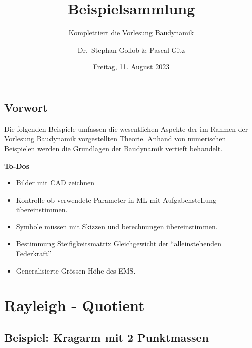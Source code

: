\documentclass[
  letterpaper,
  DIV=11]{scrreprt}
\title{Beispielsammlung}
\subtitle{Komplettiert die Vorlesung Baudynamik}
\author{Dr.~Stephan Gollob \& Pascal Gitz}
\date{Freitag, 11. August 2023}
\providecommand{\tightlist}{%
  \setlength{\itemsep}{0pt}\setlength{\parskip}{0pt}}\usepackage{longtable,booktabs,array}
\renewcommand*\contentsname{Inhaltsverzeichnis}
\newcommand\contentsname{Inhaltsverzeichnis}
\begin{document}
\maketitle
\ifdefined\Shaded\renewenvironment{Shaded}{\begin{tcolorbox}[enhanced, boxrule=0pt, sharp corners, interior hidden, borderline west={3pt}{0pt}{shadecolor}, breakable, frame hidden]}{\end{tcolorbox}}\fi

\renewcommand*\contentsname{Inhaltsverzeichnis}
{
\hypersetup{linkcolor=}
\setcounter{tocdepth}{1}
\tableofcontents
}

\hypertarget{vorwort}{%
\chapter*{Vorwort}\label{vorwort}}


Die folgenden Beispiele umfassen die wesentlichen Aspekte der im Rahmen
der Vorlesung Baudynamik vorgestellten Theorie. Anhand von numerischen
Beispielen werden die Grundlagen der Baudynamik vertieft behandelt.

\textbf{To-Dos}

\begin{itemize}
\tightlist
\item
  Bilder mit CAD zeichnen
\item
  Kontrolle ob verwendete Parameter in ML mit Aufgabenstellung
  übereinstimmen.
\item
  Symbole müssen mit Skizzen und berechnungen übereinstimmen.
\item
  Bestimmung Steifigkeitsmatrix Gleichgewicht der ``alleinstehenden
  Federkraft''
\item
  Generalisierte Grössen Höhe des EMS.
\end{itemize}

\part{Rayleigh - Quotient}

\hypertarget{beispiel-kragarm-mit-2-punktmassen}{%
\chapter{Beispiel: Kragarm mit 2
Punktmassen}\label{beispiel-kragarm-mit-2-punktmassen}}
\end{document}
